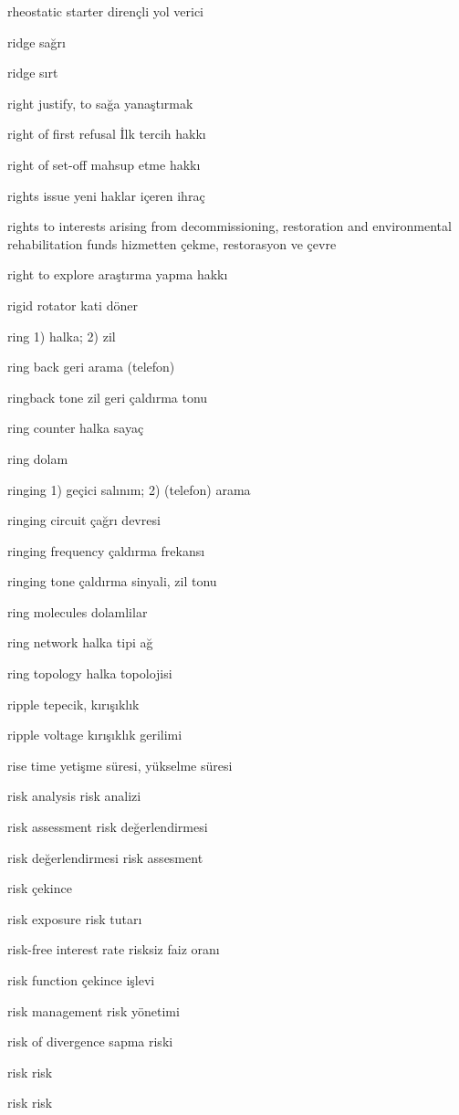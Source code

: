 \documentclass[12pt,fleqn]{article}\usepackage{../../common}
\begin{document}
rheostatic starter dirençli yol verici

ridge sağrı

ridge sırt

right justify, to sağa yanaştırmak

right of first refusal İlk tercih hakkı

right of set-off mahsup etme hakkı

rights issue yeni haklar içeren ihraç

rights to interests arising from decommissioning, restoration and environmental rehabilitation funds hizmetten çekme, restorasyon ve çevre

right to explore araştırma yapma hakkı

rigid rotator kati döner

ring 1) halka; 2) zil

ring back geri arama (telefon)

ringback tone zil geri çaldırma tonu

ring counter halka sayaç

ring dolam

ringing 1) geçici salınım; 2) (telefon) arama

ringing circuit çağrı devresi

ringing frequency çaldırma frekansı

ringing tone çaldırma sinyali, zil tonu

ring molecules dolamlilar

ring network halka tipi ağ

ring topology halka topolojisi

ripple tepecik, kırışıklık

ripple voltage kırışıklık gerilimi

rise time yetişme süresi, yükselme süresi

risk analysis risk analizi

risk assessment risk değerlendirmesi

risk değerlendirmesi risk assesment

risk çekince

risk exposure risk tutarı

risk-free interest rate risksiz faiz oranı

risk function çekince işlevi

risk management risk yönetimi

risk of divergence sapma riski

risk risk

risk risk
\end{document}
